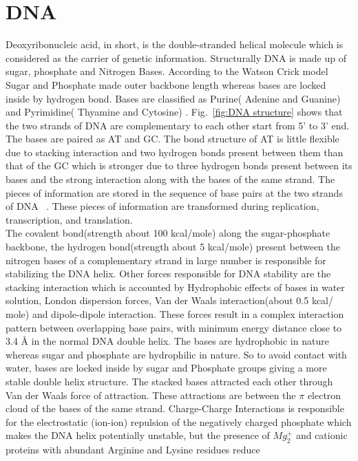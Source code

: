 \documentclass[12pt,masters,final]{UTRGVthesis}
\begin{document}
\section{DNA}
Deoxyribonucleic acid, in short, is the double-stranded helical molecule which is considered as the carrier of genetic information. 
Structurally DNA is made up of sugar, phosphate and Nitrogen Bases. According to the Watson Crick model~\cite{watson1953structure}
Sugar and Phosphate made outer backbone length whereas bases are locked inside by hydrogen bond.
Bases are classified as Purine( Adenine and Guanine) and Pyrimidine( Thyamine and Cytosine) 
. Fig.~\ref{fig:DNA structure} shows that the two strands of DNA are complementary to each other start from 5' to 3' end. The bases are paired
as AT and GC. The bond structure of AT is little flexible due to stacking interaction and two
hydrogen bonds present between them than that of the GC which is stronger due to three hydrogen bonds
present between its bases and the strong interaction along with the bases of the same strand. The pieces of information are stored in the sequence of base pairs at the two strands of DNA ~\cite{Calladine:2004, hanke2013denaturation}.
These pieces of information are transformed during replication, transcription, and translation.\\
%
\indent
The covalent bond(strength about 100 kcal/mole) along the sugar-phosphate backbone, the hydrogen bond(strength about 5 kcal/mole) present between the nitrogen bases of a complementary strand
in large number is responsible for stabilizing the DNA helix. Other forces responsible for DNA
stability are the stacking interaction which is accounted by Hydrophobic effects of bases in water solution, London dispersion forces, Van der Waals interaction(about 0.5 kcal/
mole) and dipole-dipole interaction. These
forces result in a complex interaction pattern between overlapping base pairs, with minimum energy distance close to 3.4 Å in the normal DNA double helix. The bases are hydrophobic in nature whereas sugar and phosphate are hydrophilic
in nature. So to avoid contact with water, bases are locked inside by sugar and Phosphate groups giving a more stable double helix structure.
The stacked bases attracted each other through Van der Waals force of attraction. These attractions are between
the $\pi$ electron cloud of the bases of the same strand. Charge-Charge Interactions is responsible for  the electrostatic (ion-ion)
repulsion of the negatively charged phosphate which makes the DNA helix potentially unstable, but the presence of $Mg_{2}^{+}$ and cationic proteins with abundant  Arginine and Lysine residues reduce
\end{document}
